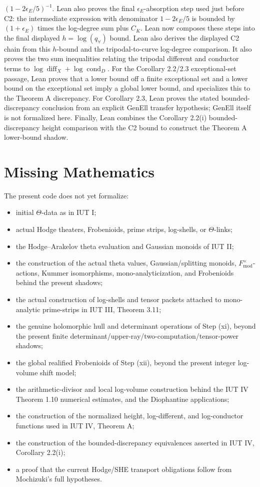 \documentclass[11pt]{article}
\begin{document}
\((1-2\epsilon_E/5)^{-1}\).
Lean also proves the final \(\epsilon_E\)-absorption step used just before C2:
the intermediate expression with denominator \(1-2\epsilon_E/5\) is bounded by
\((1+\epsilon_E)\) times the log-degree sum plus \(C_K\).
Lean now composes these steps into the final displayed \(h=\log(q_\forall)\)
bound.
Lean also derives the displayed C2 chain from this \(h\)-bound and the
tripodal-to-curve log-degree comparison.
It also proves the two sum inequalities relating the tripodal different and
conductor terms to \(\log\operatorname{diff}_X+\log\operatorname{cond}_D\).
For the Corollary 2.2/2.3 exceptional-set passage, Lean proves that a lower
bound off a finite exceptional set and a lower bound on the exceptional set imply
a global lower bound, and specializes this to the Theorem A discrepancy.
For Corollary 2.3, Lean proves the stated bounded-discrepancy conclusion from an
explicit GenEll transfer hypothesis; GenEll itself is not formalized here.
Finally, Lean combines the Corollary 2.2(i) bounded-discrepancy height
comparison with the C2 bound to construct the Theorem A lower-bound shadow.

\section{Missing Mathematics}

The present code does not yet formalize:
\begin{itemize}
\item initial \(\Theta\)-data as in IUT I;
\item actual Hodge theaters, Frobenioids, prime strips, log-shells, or
  \(\Theta\)-links;
\item the Hodge--Arakelov theta evaluation and Gaussian monoids of IUT II;
\item the construction of the actual theta values, Gaussian/splitting monoids,
  \(F_{\mathrm{mod}}^\times\)-actions, Kummer isomorphisms,
  mono-analyticization, and Frobenioids behind the present shadows;
\item the actual construction of log-shells and tensor packets attached to
  mono-analytic prime-strips in IUT III, Theorem 3.11;
\item the genuine holomorphic hull and determinant operations of Step (xi),
  beyond the present finite determinant/upper-ray/two-computation/tensor-power
  shadows;
\item the global realified Frobenioids of Step (xii), beyond the present integer
  log-volume shift model;
\item the arithmetic-divisor and local log-volume construction behind the IUT IV
  Theorem 1.10 numerical estimates, and the Diophantine applications;
\item the construction of the normalized height, log-different, and log-conductor
  functions used in IUT IV, Theorem A;
\item the construction of the bounded-discrepancy equivalences asserted in
  IUT IV, Corollary 2.2(i);
\item a proof that the current Hodge/SHE transport obligations follow from
  Mochizuki's full hypotheses.
\end{itemize}
\end{document}
